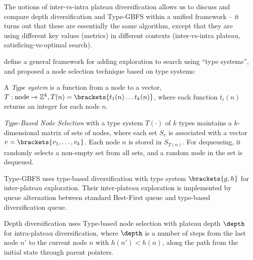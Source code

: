 The notions of inter-vs-intra plateau diversification allows us to discuss and compare depth
diversification \cite{Asai2016} and Type-GBFS \cite{xie14type} within a unified framework -- it
turns out that these are essentially the same algorithm, except that they are using different key
values (metrics) in different contexts (inter-vs-intra plateau, satisficing-vs-optimal search).

\cite{lelis2013stratified} define a general framework for
adding exploration to search using ``type systems'', and \cite{xie14type} proposed a node selection technique based on type systems:

\begin{defi} 
A \emph{Type system} \cite{lelis2013stratified} is a 
function from a node to a vector,
$T: \text{node} \rightarrow \mathbb{Z}^k, T(n)=\brackets{t_1(n) \ldots t_k(n)} $, where each function $t_i(n)$ returns an integer for each node $n$.
\end{defi}

\begin{defi}
 \emph{Type-Based Node Selection} \cite{xie14type}
with a type system $T(\cdot)$ of $k$ types maintains a $k$-dimensional matrix of sets of nodes,
 where each set $S_v$ is associated with a vector $v=\brackets{v_1,\ldots,v_k}$.
 Each node $n$ is stored in $S_{T(n)}$.
 For dequeueing, it randomly selects a non-empty set from all sets,
 and a random node in the set is dequeued.
\end{defi}


Type-GBFS \cite{xie14type} uses type-based diversification with type system $\brackets{g,h}$ for
inter-plateau exploration. Their inter-plateau exploration is implemented by queue alternation
\cite{RogerH10} between standard Best-First queue and type-based diversification queue.

Depth diversification \cite{Asai2016} %
uses Type-based node selection with plateau depth $\depth$ for
intra-plateau diversification, where $\depth$ is a number of steps from the last node $n'$ to the
current node $n$ with $h(n')<h(n)$, along the path from the initial state through parent pointers.

